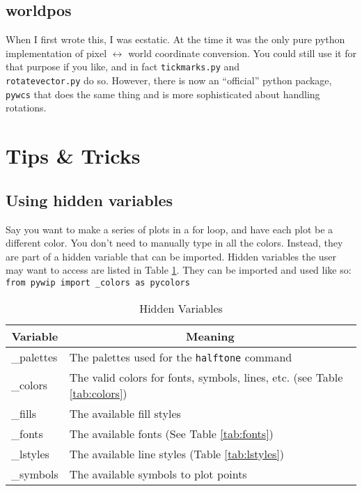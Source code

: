\documentclass[12pt]{article}
\begin{document}
\subsection{worldpos}

When I first wrote this, I was ecstatic.  At the time it was the only pure
python implementation of pixel $\leftrightarrow$ world coordinate conversion. 
You could still \hfill use \hfill it \hfill for \hfill that \hfill purpose
\hfill if \hfill you \hfill like, \hfill and \hfill in \hfill fact \hfill 
\texttt{tickmarks.py} \hfill and  \\
\texttt{rotatevector.py} do so.  However, there is
now an ``official'' python package, \texttt{pywcs} that does the same thing and
is more sophisticated about handling rotations.

\section{Tips \& Tricks}

\subsection{Using hidden variables}

Say you want to make a series of plots in a for loop, and have each plot be a
different color.  You don't need to manually type in all the colors.  Instead,
they are part of a hidden variable that can be imported.  Hidden variables
the user may want to access are listed in Table \ref{tab:hidden}.  They
can be imported and used like so:\\
\texttt{from pywip import \_colors as pycolors}

\begin{table}
\caption{\label{tab:hidden} Hidden Variables}
\begin{center}
\begin{tabular}{ll}
\hline
\hline
\multicolumn{1}{c}{Variable} & \multicolumn{1}{c}{Meaning}\\
\hline
\_palettes & The palettes used for the \texttt{halftone} command\\
\_colors   & The valid colors for fonts, symbols, lines, etc. (see Table
             \ref{tab:colors})\\
\_fills    & The available fill styles\\
\_fonts    & The available fonts (See Table \ref{tab:fonts})\\
\_lstyles  & The available line styles (Table \ref{tab:lstyles})\\
\_symbols  & The available symbols to plot points\\
\hline
\end{tabular}
\end{center}
\end{table}
\end{document}
